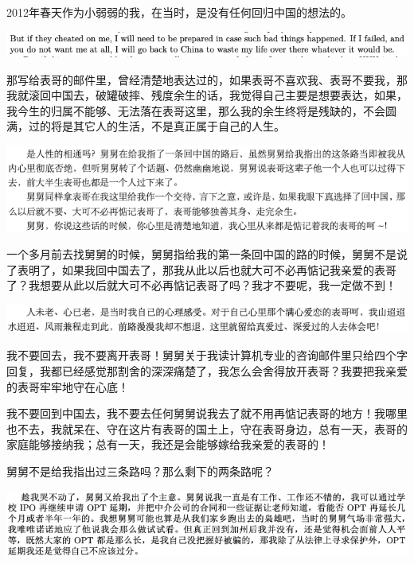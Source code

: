 \documentclass[9pt, b5paper]{article}
\begin{document}
2012年春天作为小弱弱的我，在当时，是没有任何回归中国的想法的。 

\begin{center}
\includegraphics[width=.9\linewidth]{./pic/backups_plans_20210415_173600.png}
\end{center}

那写给表哥的邮件里，曾经清楚地表达过的，如果表哥不喜欢我、表哥不要我，那我就滚回中国去，破罐破摔、残度余生的话，我觉得自己主要是想要表达，如果，我今生的归属不能够、无法落在表哥这里，那么我的余生终将是残缺的，不会圆满，过的将是其它人的生活，不是真正属于自己的人生。 

\begin{center}
\includegraphics[width=.9\linewidth]{./pic/backups_plans_20210415_175626.png}
\end{center}

一个多月前去找舅舅的时候，舅舅指给我的第一条回中国的路的时候，舅舅不是说了表明了，如果我回中国去了，那我从此以后也就大可不必再惦记我亲爱的表哥了？我想要从此以后就大可不必再惦记表哥了吗？我才不要呢，我一定做不到！

\begin{center}
\includegraphics[width=.9\linewidth]{./pic/backups_plans_20210416_080253.png}
\end{center}

我不要回去，我不要离开表哥！舅舅关于我读计算机专业的咨询邮件里只给四个字回复，我都已经感觉那割舍的深深痛楚了，我怎么会舍得放开表哥？我要把我亲爱的表哥牢牢地守在心底！

我不要回到中国去，我不要去任何舅舅说我去了就不用再惦记表哥的地方！我哪里也不去，我就呆在、守在这片有表哥的国土上，守在表哥身边，总有一天，表哥的家庭能够接纳我；总有一天，我还是会能够嫁给我亲爱的表哥的！

舅舅不是给我指出过三条路吗？那么剩下的两条路呢？

\begin{center}
\includegraphics[width=.9\linewidth]{./pic/backups_plans_20210416_073313.png}
\end{center}
\end{document}
